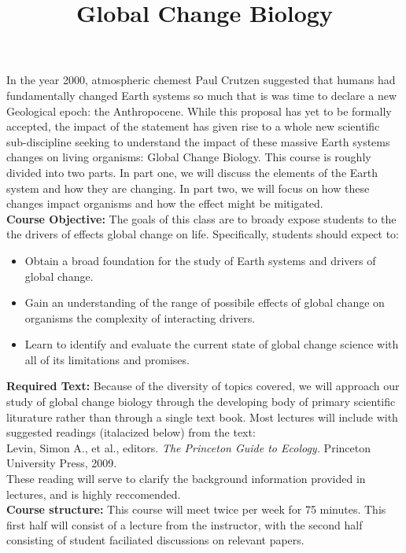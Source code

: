 \documentclass{article}\usepackage[]{graphicx}\usepackage[]{color}
\begin{document}
\title{Global Change Biology}
\date{}
\maketitle{}
\indent In the year 2000, atmospheric chemest Paul Crutzen suggested that humans had fundamentally changed Earth systems so much that is was time to declare a new Geological epoch: the Anthropocene. While this proposal has yet to be formally accepted, the impact of the statement has given rise to a whole new scientific sub-discipline seeking to understand the impact of these massive Earth systems changes on living organisms: Global Change Biology. This course is roughly divided into two parts. In part one, we will discuss the elements of the Earth system and how they are changing. In part two, we will focus on how these changes impact organisms and how the effect might be mitigated. \\

\indent\textbf{Course Objective:} The goals of this class are to broady expose students to the the  drivers of effects global change on life. Specifically, students should expect to:
\begin{itemize}
\item Obtain a broad foundation for the study of Earth systems and drivers of global change.
\item Gain an understanding of the range of possibile effects of global change on organisms the complexity of interacting drivers.
\item Learn to identify and evaluate the current state of global change science with all of its limitations and promises.
\end{itemize}

\textbf{Required Text:} Because of the diversity of topics covered, we will approach our study of global change biology through the developing body of primary scientific liturature rather than through a single text book. Most lectures will include with suggested readings (italacized below) from the text:\\

\indent Levin, Simon A., et al., editors. \textit{The Princeton Guide to Ecology.} Princeton University Press, 2009.\\

These reading will serve to clarify the background information provided in lectures, and is highly reccomended.\\

\textbf{Course structure:} This course will meet twice per week for 75 minutes. This first half will consist of a lecture from the instructor, with the second half consisting of student faciliated discussions on relevant papers.\\
\end{document}
